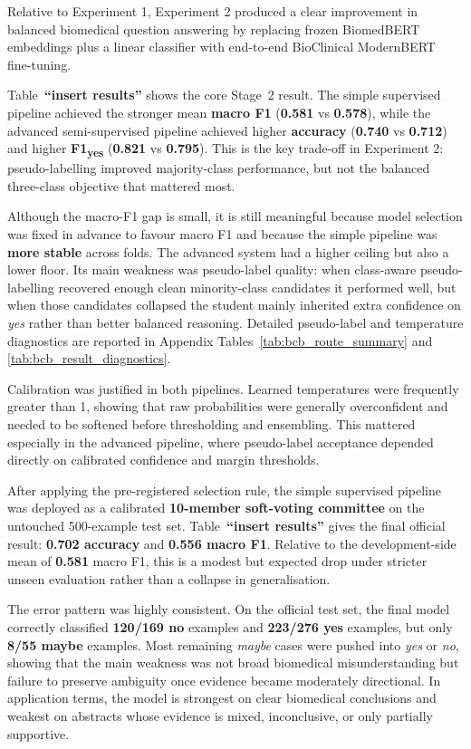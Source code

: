 \documentclass[11pt]{article}
\begin{document}
Relative to Experiment 1, Experiment 2 produced a clear improvement in balanced biomedical question answering by replacing frozen BiomedBERT embeddings plus a linear classifier with end-to-end BioClinical ModernBERT fine-tuning.

Table~\textbf{``insert results''} shows the core Stage~2 result. The simple supervised pipeline achieved the stronger mean \textbf{macro F1} (\textbf{0.581} vs \textbf{0.578}), while the advanced semi-supervised pipeline achieved higher \textbf{accuracy} (\textbf{0.740} vs \textbf{0.712}) and higher \textbf{F1\textsubscript{yes}} (\textbf{0.821} vs \textbf{0.795}). This is the key trade-off in Experiment 2: pseudo-labelling improved majority-class performance, but not the balanced three-class objective that mattered most.

Although the macro-F1 gap is small, it is still meaningful because model selection was fixed in advance to favour macro F1 and because the simple pipeline was \textbf{more stable} across folds. The advanced system had a higher ceiling but also a lower floor. Its main weakness was pseudo-label quality: when class-aware pseudo-labelling recovered enough clean minority-class candidates it performed well, but when those candidates collapsed the student mainly inherited extra confidence on \textit{yes} rather than better balanced reasoning. Detailed pseudo-label and temperature diagnostics are reported in Appendix Tables~\ref{tab:bcb_route_summary} and \ref{tab:bcb_result_diagnostics}.

Calibration was justified in both pipelines. Learned temperatures were frequently greater than 1, showing that raw probabilities were generally overconfident and needed to be softened before thresholding and ensembling. This mattered especially in the advanced pipeline, where pseudo-label acceptance depended directly on calibrated confidence and margin thresholds.

After applying the pre-registered selection rule, the simple supervised pipeline was deployed as a calibrated \textbf{10-member soft-voting committee} on the untouched 500-example test set. Table~\textbf{``insert results''} gives the final official result: \textbf{0.702 accuracy} and \textbf{0.556 macro F1}. Relative to the development-side mean of \textbf{0.581} macro F1, this is a modest but expected drop under stricter unseen evaluation rather than a collapse in generalisation.

The error pattern was highly consistent. On the official test set, the final model correctly classified \textbf{120/169 no} examples and \textbf{223/276 yes} examples, but only \textbf{8/55 maybe} examples. Most remaining \textit{maybe} cases were pushed into \textit{yes} or \textit{no}, showing that the main weakness was not broad biomedical misunderstanding but failure to preserve ambiguity once evidence became moderately directional. In application terms, the model is strongest on clear biomedical conclusions and weakest on abstracts whose evidence is mixed, inconclusive, or only partially supportive.
\end{document}
